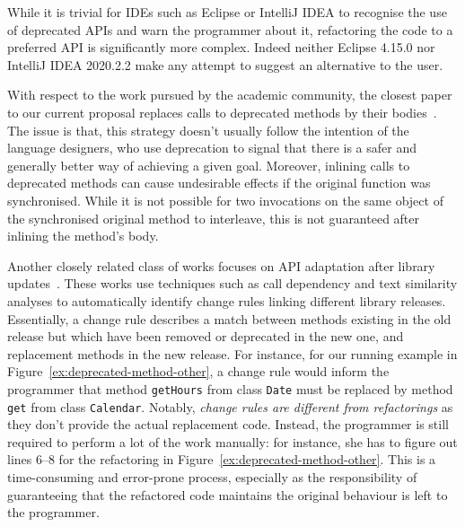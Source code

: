 \documentclass[sigconf,review,anonymous]{acmart}
\begin{document}
While it is trivial for IDEs such as Eclipse or IntelliJ IDEA to
recognise the use of deprecated APIs and warn the programmer about it,
refactoring the code to a preferred API is significantly more
complex. Indeed neither Eclipse 4.15.0 nor IntelliJ IDEA 2020.2.2 make
any attempt to suggest an alternative to the user.

With respect to the work pursued by the academic community, 
the closest paper to our current proposal
replaces calls
to deprecated methods by their
bodies~\cite{DBLP:conf/paste/Perkins05}.  The issue is that, this
strategy doesn't usually follow the intention of the language designers, who
use deprecation to signal that there is a safer and generally better
way of achieving a given goal.  Moreover, inlining calls to deprecated
methods can cause undesirable effects if the original function was
synchronised.  While it is not possible for two invocations on the
same object of the synchronised original method to interleave, this is
not guaranteed after inlining the method's body.


Another closely related class of works focuses on API adaptation after library updates~\cite{DBLP:conf/icse/WuGAK10,DBLP:conf/kbse/Huang0PW021}. These works use techniques such as call dependency and text similarity analyses to automatically identify change rules linking different library releases. Essentially, a change rule describes a match between methods existing in the old release but which have been removed or deprecated in the new one, and replacement methods in the new release. For instance, for our running example in Figure~\ref{ex:deprecated-method-other}, a change rule would inform the programmer that  method \texttt{getHours} from class \texttt{Date} must be replaced by method \texttt{get} from class \texttt{Calendar}. Notably, {\em change rules are different from refactorings} as they don't provide the actual replacement code. Instead, the programmer is still required to perform a lot of the work
manually: for instance, she has to figure out lines 6--8 for the refactoring in Figure~\ref{ex:deprecated-method-other}. This is a time-consuming and error-prone process, especially as the
responsibility of guaranteeing that the refactored code maintains the original behaviour
is left to the programmer.
\end{document}
